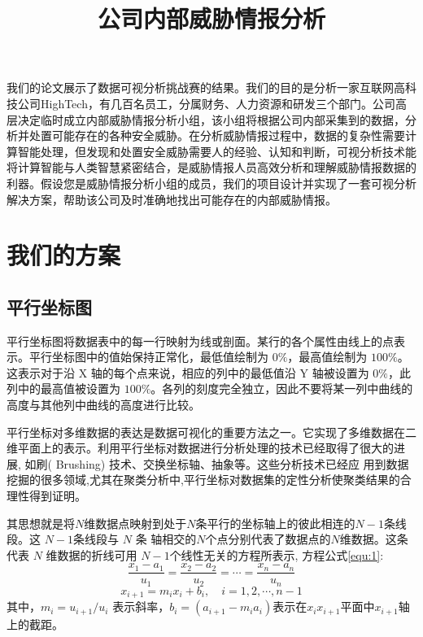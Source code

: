 \documentclass[journal]{vgtc}                %
\title{公司内部威胁情报分析}
\begin{document}


\maketitle

我们的论文展示了数据可视分析挑战赛的结果。我们的目的是分析一家互联网高科技公司HighTech，有几百名员工，分属财务、人力资源和研发三个部门。公司高层决定临时成立内部威胁情报分析小组，该小组将根据公司内部采集到的数据，分析并处置可能存在的各种安全威胁。在分析威胁情报过程中，数据的复杂性需要计算智能处理，但发现和处置安全威胁需要人的经验、认知和判断，可视分析技术能将计算智能与人类智慧紧密结合，是威胁情报人员高效分析和理解威胁情报数据的利器。假设您是威胁情报分析小组的成员，我们的项目设计并实现了一套可视分析解决方案，帮助该公司及时准确地找出可能存在的内部威胁情报。

\section{我们的方案}
\subsection{平行坐标图}
平行坐标图将数据表中的每一行映射为线或剖面。某行的各个属性由线上的点表示。平行坐标图中的值始保持正常化，最低值绘制为 $0\%$，最高值绘制为 $100\%$。这表示对于沿 X 轴的每个点来说，相应的列中的最低值沿 Y 轴被设置为 $0\%$，此列中的最高值被设置为 $100\%$。各列的刻度完全独立，因此不要将某一列中曲线的高度与其他列中曲线的高度进行比较。

平行坐标对多维数据的表达是数据可视化的重要方法之一。它实现了多维数据在二维平面上的表示。利用平行坐标对数据进行分析处理的技术已经取得了很大的进展, 如刷( Brushing) 技术、交换坐标轴、抽象等。这些分析技术已经应 用到数据挖掘的很多领域,尤其在聚类分析中,平行坐标对数据集的定性分析使聚类结果的合理性得到证明。

其思想就是将$N$维数据点映射到处于$N$条平行的坐标轴上的彼此相连的$N-1$条线段。这 $N - 1$条线段与 $N$ 条 轴相交的$N$个点分别代表了数据点的$N$维数据。这条代表 $N$ 维数据的折线可用 $N -1$个线性无关的方程所表示, 方程公式\ref{equ:1}:
\begin{equation}
\label{equ:1}
\frac{x_1-a_1}{u_1}=\frac{x_2-a_2}{u_2}=\cdots = \frac{x_n-a_n}{u_n}
\end{equation}
\begin{equation}
\label{equ:2}
x_{i+1} = m_ix_i+b_i, \quad i = 1, 2, \cdots, n-1
\end{equation}
其中，$m_i = u_{i+1} / u_i$ 表示斜率，$b_i = (a_{i+1} - m_ia_i)$表示在$x_ix_{i+1}$平面中$x_{i+1}$轴上的截距。
\end{document}
